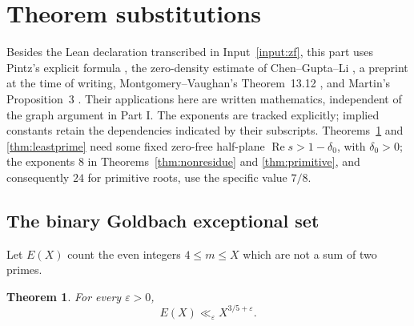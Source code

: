 \documentclass[11pt]{article}
\newtheorem{theorem}{Theorem}[section]
\theoremstyle{definition}
\DeclareMathOperator{\Rea}{Re}
\begin{document}
\section{Theorem substitutions}
Besides the Lean declaration transcribed in Input~\ref{input:zf},
this part uses Pintz's explicit formula \cite{PintzI}, the zero-density
estimate of Chen--Gupta--Li \cite{CGL}, a preprint at the time of writing,
Montgomery--Vaughan's Theorem~13.12 \cite{MV}, and Martin's
Proposition~3 \cite{Martin1997}. Their applications here are written
mathematics, independent of the graph argument in Part I.
The exponents are tracked explicitly; implied constants retain the
dependencies indicated by their subscripts.
Theorems~\ref{thm:goldbach} and \ref{thm:leastprime} need some fixed
zero-free half-plane $\Rea s>1-\delta_0$, with $\delta_0>0$;
the exponents $8$ in Theorems~\ref{thm:nonresidue} and
\ref{thm:primitive}, and consequently $24$ for primitive roots,
use the specific value $7/8$.

\subsection{The binary Goldbach exceptional set}
Let $E(X)$ count the even integers $4\le m\le X$ which are not a sum
of two primes.

\begin{theorem}\label{thm:goldbach}
For every $\varepsilon>0$,
\begin{equation}\label{eq:goldbach}
 E(X)\ll_\varepsilon X^{3/5+\varepsilon}.
\end{equation}
\end{theorem}
\end{document}

